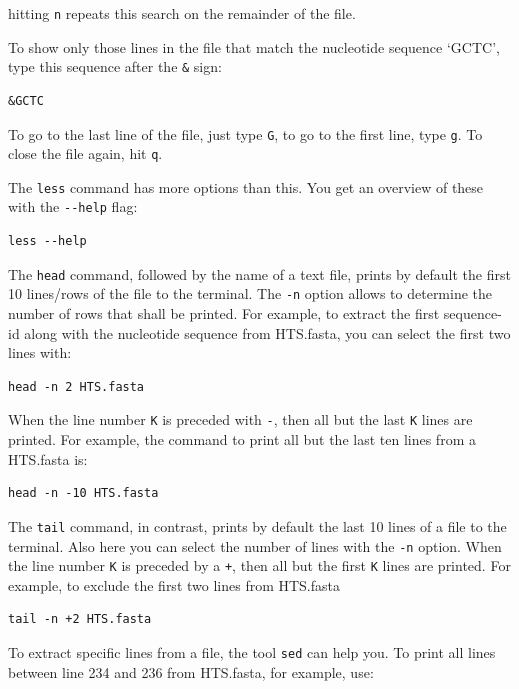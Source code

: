 \documentclass[11pt]{article}
\begin{document}
hitting \texttt{n} repeats this search on the remainder of the file.

To show only those lines in the file that match the nucleotide
sequence `GCTC', type this sequence after the \texttt{\&} sign:


\begin{verbatim}
&GCTC
\end{verbatim}
 
To go to the last line of the file, just type \texttt{G}, to go to the first
line, type \texttt{g}. To close the file again, hit \texttt{q}.


The \texttt{less} command has more options than this. You get an overview of
these with the \texttt{-{}-help} flag:


\begin{verbatim}
less --help
\end{verbatim}


The \texttt{head} command, followed by the name of a text file, prints by
default the first 10 lines/rows of the file to the terminal.  The \texttt{-n}
option allows to determine the number of rows that shall be
printed. For example, to extract the first sequence-id along with the
nucleotide sequence from HTS.fasta, you can select the first two lines
with:


\begin{verbatim}
head -n 2 HTS.fasta
\end{verbatim}

When the line number \texttt{K} is preceded with \texttt{-}, then all but the last \texttt{K}
lines are printed. For example, the command to print all but the last
ten lines from a HTS.fasta is:


\begin{verbatim}
head -n -10 HTS.fasta
\end{verbatim}

The \texttt{tail} command, in contrast, prints by default the last 10 lines
of a file to the terminal. Also here you can select the number of
lines with the \texttt{-n} option. When the line number \texttt{K} is preceded by a
\texttt{+}, then all but the first \texttt{K} lines are printed.  For example, to
exclude the first two lines from HTS.fasta


\begin{verbatim}
tail -n +2 HTS.fasta
\end{verbatim}


To extract specific lines from a file, the tool \texttt{sed} can help you. To
print all lines between line 234 and 236 from HTS.fasta, for example, use:
\end{document}
